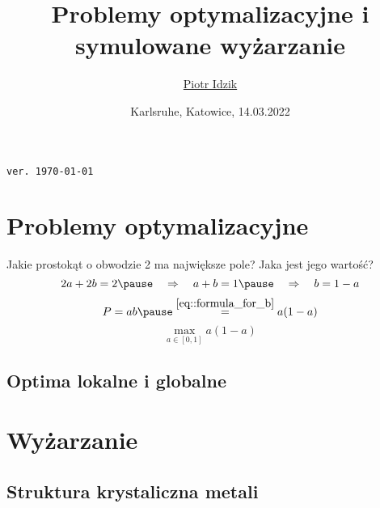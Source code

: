 \documentclass[aspectratio=169]{beamer}
\author{\texorpdfstring{\href{\myLinkedinLink}{Piotr Idzik} \\ \email{\myEmail}}{Piotr Idzik}}
\title{Problemy optymalizacyjne i symulowane wyżarzanie}
\date{Karlsruhe, Katowice, 14.03.2022}
\newcommand{\myLinkedinLink}{https://www.linkedin.com/in/piotr-idzik-34b572151/}
\newcommand{\myGithubLink}{https://github.com/vil02/}
\newcommand{\myLinkedin}{\href{\myLinkedinLink}{\faLinkedinSquare}}
\newcommand{\myGithub}{\href{\myGithubLink}{\faGithubSquare}}
\newcommand{\paren}[1]{\!\left(#1 \right)}
\begin{document}
\begin{frame}[plain]
\maketitle

\myLinkedin{}
\myGithub{}
\hfill \textcolor[rgb]{0.85,0.85,0.85}{\texttt{\tiny{ver. \today\ \currenttime}}}
\end{frame}
\section{Problemy optymalizacyjne}
\begin{frame}
Jakie prostokąt o obwodzie 2 ma największe pole?
\pause{}
Jaka jest jego wartość?
\pause{}
\begin{equation} \label{eq::formula_for_b}
2a+2b = 2 \pause \quad \Rightarrow \quad a+b = 1 \pause \quad \Rightarrow \quad b=1-a
\end{equation}
\pause{}
\begin{equation*}
P = ab \pause \stackrel{\eqref{eq::formula_for_b}}{=} a\paren{1-a}
\end{equation*}
\pause{}
\begin{equation*}
\max_{a \in [0, 1]} a\paren{1-a}
\end{equation*}
\pause{}
\begin{figure}
  \center{}
  {\rectangleAreaPlotTex}
\end{figure}
\end{frame}

\subsection{Optima lokalne i globalne}
{\localOptimumsTex}

\section{Wyżarzanie}
\subsection{Struktura krystaliczna metali}
{\crystalsExamplesTex}
\end{document}
